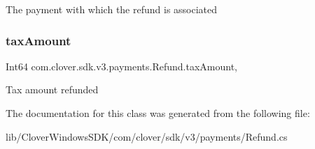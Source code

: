 The payment with which the refund is associated 

\mbox{\label{classcom_1_1clover_1_1sdk_1_1v3_1_1payments_1_1_refund_a7c8a0b3ac90acd6707b4a6e1bd455488}} 
\subsubsection{\texorpdfstring{tax\+Amount}{taxAmount}}
{\footnotesize\ttfamily Int64 com.\+clover.\+sdk.\+v3.\+payments.\+Refund.\+tax\+Amount\hspace{0.3cm}{\ttfamily [get]}, {\ttfamily [set]}}



Tax amount refunded 



The documentation for this class was generated from the following file\+:\begin{DoxyCompactItemize}
\item 
lib/\+Clover\+Windows\+S\+D\+K/com/clover/sdk/v3/payments/Refund.\+cs\end{DoxyCompactItemize}
